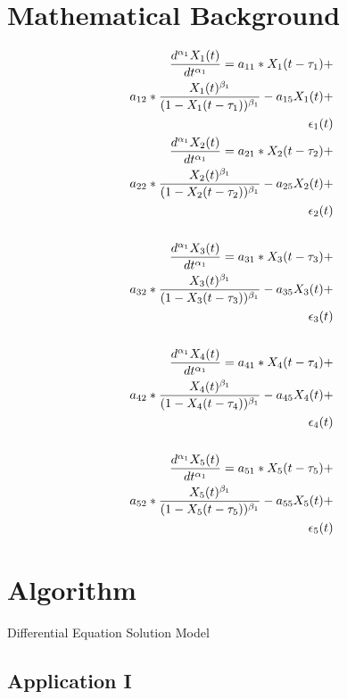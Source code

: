 \section{Mathematical Background}


\begin{align*} 
\tiny
\frac{d^{\alpha_1}X_1(t)}{dt^{\alpha_1}} = a_{11} *X_1(t - \tau_1) + \\
a_{12} *\frac{X_1(t)^{\beta_1}}{(1-X_1(t - \tau_1))^{\beta_1}} - a_{15}X_1(t) + \\
\epsilon_1(t) \\
\frac{d^{\alpha_1}X_2(t)}{dt^{\alpha_1}} = a_{21} *X_2(t - \tau_2) + \\
a_{22} *\frac{X_2(t)^{\beta_1}}{(1-X_2(t - \tau_2))^{\beta_1}} - a_{25}X_2(t) + \\
\epsilon_2(t) \\ \\
\frac{d^{\alpha_1}X_3(t)}{dt^{\alpha_1}} = a_{31} *X_3(t - \tau_3) + \\
a_{32} *\frac{X_3(t)^{\beta_1}}{(1-X_3(t - \tau_3))^{\beta_1}} - a_{35}X_3(t) + \\
\epsilon_3(t) \\ \\
\frac{d^{\alpha_1}X_4(t)}{dt^{\alpha_1}} = a_{41} *X_4(t - \tau_4) + \\
a_{42} *\frac{X_4(t)^{\beta_1}}{(1-X_4(t - \tau_4))^{\beta_1}} - a_{45}X_4(t) + \\
\epsilon_4(t) \\ \\
\frac{d^{\alpha_1}X_5(t)}{dt^{\alpha_1}} = a_{51} *X_5(t - \tau_5) + \\
a_{52} *\frac{X_5(t)^{\beta_1}}{(1-X_5(t - \tau_5))^{\beta_1}} - a_{55}X_5(t) + \\
\epsilon_5(t) \\
\end{align*}



\section{Algorithm}

	
\begin{algorithm}[H]
	\begin{algorithmic}[1]
\end{algorithmic}
	\caption{Differential Equation Solution Model}
	\label{DES_Model}
\end{algorithm}

\subsection{Application I}

